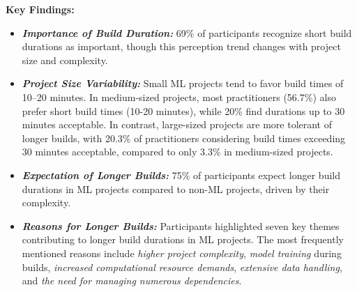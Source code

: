 

\begin{highlightbox}
\textbf{Key Findings:}
\begin{itemize}
    \item \textit{\textbf{Importance of Build Duration:}} 69\% of participants recognize short build durations as important, though this perception trend changes with project size and complexity.
    \item \textit{\textbf{Project Size Variability:}} Small ML projects tend to favor build times of 10–20 minutes.
    In medium-sized projects, most practitioners (56.7\%) also prefer short build times (10-20 minutes), while 20\% find durations up to 30 minutes acceptable.
    In contrast, large-sized projects are more tolerant of longer builds, with 20.3\% of practitioners considering build times exceeding 30 minutes acceptable, compared to only 3.3\% in medium-sized projects.
    \item \textit{\textbf{Expectation of Longer Builds:}} 75\% of participants expect longer build durations in ML projects compared to non-ML projects, driven by their complexity.
    \item \textit{\textbf{Reasons for Longer Builds:}} Participants highlighted seven key themes contributing to longer build durations in ML projects. The most frequently mentioned reasons include \textit{higher project complexity}, \textit{model training} during builds, \textit{increased computational resource demands}, \textit{extensive data handling}, and \textit{the need for managing numerous dependencies}.
\end{itemize}
\end{highlightbox}

